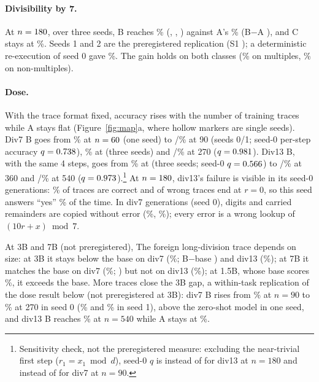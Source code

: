 \documentclass{article}
\theoremstyle{definition}
\begin{document}
\paragraph{Divisibility by 7.} At $n=180$, over three seeds, B reaches \divsevenB\% (\divsevenBsZero, \divsevenBsOne, \divsevenBsTwo) against A's \divsevenA\% (B$-$A \divsevenBAdiff{} \divsevenBAci), and C stays at \divsevenC\%. Seeds 1 and 2 are the preregistered replication (S1 \verdictSOne); a deterministic re-execution of seed 0 gave \divsevenBsZeroRerun\%. The gain holds on both classes (\divsevenByes\% on multiples, \divsevenBno\% on non-multiples).

\paragraph{Dose.} With the trace format fixed, accuracy rises with the number of training traces while A stays flat (Figure~\ref{fig:map}a, where hollow markers are single seeds). Div7 B goes from \divsevenBnSixty\% at $n=60$ (one seed) to \divsevenBnNinetysZero/\divsevenBnNinetysOne\% at 90 (seeds 0/1; seed-0 per-step accuracy $q=0.738$), \divsevenBnOneEighty\% at \nTrain{} (three seeds) and \divsevenBnTwoSeventysZero/\divsevenBnTwoSeventysOne\% at 270 ($q=0.981$). Div13 B, with the same 4 steps, goes from \divthirteenBnOneEighty\% at \nTrain{} (three seeds; seed-0 $q=0.566$) to \divthirteenBnThreeSixtysZero/\divthirteenBnThreeSixtysOne\% at 360 and \divthirteenBnFiveFortysZero/\divthirteenBnFiveFortysOne\% at 540 ($q=0.973$).\footnote{Sensitivity check, not the preregistered measure: excluding the near-trivial first step ($r_1=x_1\bmod d$), seed-0 $q$ is \qAfterDivthirteenOneEighty{} instead of \qAllDivthirteenOneEighty{} for div13 at $n=180$ and \qAfterDivsevenNinety{} instead of \qAllDivsevenNinety{} for div7 at $n=90$.} At $n=180$, div13's failure is visible in its seed-0 generations: \divthirteenTraceOK\% of traces are correct and \divthirteenWrongZero{} of \divthirteenWrongN{} wrong traces end at $r=0$, so this seed answers ``yes'' \divthirteenPredYes\% of the time. In div7 generations (seed 0), digits and carried remainders are copied without error (\divsevenDigitCopy\%, \divsevenCarry\%); every error is a wrong lookup of $(10r+x)\bmod 7$.

At 3B and 7B (not preregistered), The foreign long-division trace depends on size: at 3B it stays below the base on div7 (\threeBdivsevenB\%; B$-$base \threeBdivsevenBootBBaseDiff{} \threeBdivsevenBootBBaseCi) and div13 (\threeBdivthirteenB\%); at 7B it matches the base on div7 (\sevenBdivsevenB\%; \sevenBdivsevenBootBBaseDiff{} \sevenBdivsevenBootBBaseCi) but not on div13 (\sevenBdivthirteenB\%); at 1.5B, whose base scores \divsevenBase\%, it exceeds the base. More traces close the 3B gap, a within-task replication of the dose result below (not preregistered at 3B): div7 B rises from \threeBdivsevenBnNinetysZero\% at $n=90$ to \threeBdivsevenBnTwoSeventysZero\% at 270 in seed 0 (\threeBdivsevenBnNinetysOne\% and \threeBdivsevenBnTwoSeventysOne\% in seed 1), above the zero-shot model in one seed, and div13 B reaches \threeBdivthirteenBnFiveForty\% at $n=540$ while A stays at \threeBdivthirteenAnFiveForty\%.
\end{document}
